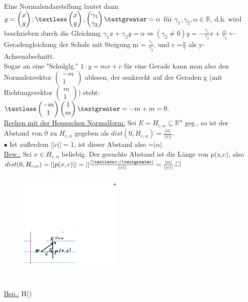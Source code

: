 \documentclass[]{scrartcl}
\begin{document}
Eine Normalendarstellung lautet dann $g={\begin{pmatrix}
		x\\
		y
\end{pmatrix} ;\textless \begin{pmatrix}
x\\
y
\end{pmatrix} ,
\begin{pmatrix}
	\gamma_1\\
	\gamma_2
\end{pmatrix}  \textgreater = \alpha}$ für $\gamma_1, \gamma_2, \alpha \in \mathbb{R}$, d.h. wird beschrieben durch die Gleichung $\gamma_1 x+ \gamma_2 y = \alpha \Leftrightarrow (\gamma_2 \neq 0) y = -\frac{\gamma_1}{\gamma_2}x + \frac{\alpha}{\gamma_2} \leftarrow$ Geradengleichung der Schule mit Steigung m = $\frac{\gamma_1}{\gamma_2}$, und c =$\frac{\alpha}{\gamma}$ als y-Achsenabschnitt.\\
Sogar an eine "Schulglg." $1\cdot y=mx+c$
 für eine Gerade kann man also den Normalenvektor $\begin{pmatrix}
 	-m\\
 	1
 \end{pmatrix}$ ablesen, der senkrecht auf der Geraden g (mit Richtungsvektor $\begin{pmatrix}
 m\\
 1
 \end{pmatrix}$) steht: $\textless \begin{pmatrix}
 -m\\
 1
 \end{pmatrix}\begin{pmatrix}
 1\\
 m
 \end{pmatrix} \textgreater = -m +m =0$.\\
  \underline{Rechen mit der Hesseschen Normalform:}
 Sei $E= H_{c,\alpha}\subseteq \mathbb{R}^n$ geg., so ist der Abstand von 0 zu $H_{c,\alpha}$ gegeben als $dist(0,H_{c,\alpha})=\frac{|\alpha|}{||c||}$.\\
 $\bullet$ Ist außerdem $||c||=1$, ist dieser Abstand also =$|\alpha|$.\\
 \underline{Bew.:} Sei $x\in H_{c,\alpha}$ beliebig.
 Der gesuchte Abstand ist die Länge von p(x,c), also $dist(0, H_{c,\alpha})=||p(x,c)||=||\frac{|\textless x,c\textgreater|}{||c||}=\frac{|\alpha|}{||c||}. \square$
 \begin{figure}[h]
 	\includegraphics[width=5cm,height=5cm]{Beispiel 2.8}
 \end{figure}\\
\underline{Bsp.:} H()
\end{document}
